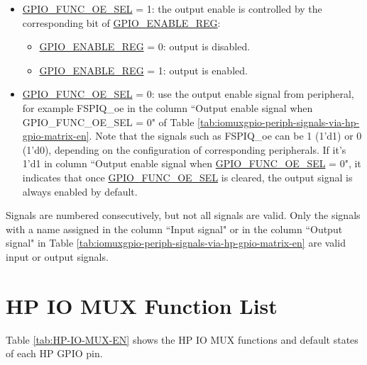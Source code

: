 \documentclass[main\_\_EN.tex]{subfiles}
\begin{document}
\begin{itemize}
    \item \hyperref[fielddesc:GPIOFUNCNOESEL]{GPIO\_FUNC\_OE\_SEL} = 1: the output enable is controlled by the corresponding bit  of \hyperref[regdesc:GPIOENABLEREG]{GPIO\_ENABLE\_REG}:
    \begin{itemize}
        \item \hyperref[regdesc:GPIOENABLEREG]{GPIO\_ENABLE\_REG} = 0: output is disabled.
        \item \hyperref[regdesc:GPIOENABLEREG]{GPIO\_ENABLE\_REG} = 1: output is enabled.
    \end{itemize}
    \item \hyperref[fielddesc:GPIOFUNCNOESEL]{GPIO\_FUNC\_OE\_SEL} = 0: use the output enable signal from peripheral, for example FSPIQ\_oe in the column ``Output enable signal when GPIO\_FUNC\_OE\_SEL = 0" of Table \ref{tab:iomuxgpio-periph-signals-via-hp-gpio-matrix-en}. Note that the signals such as FSPIQ\_oe can be 1 (1'd1) or 0 (1'd0), depending on the configuration of corresponding peripherals. If it's 1'd1 in column ``Output enable signal when \hyperref[fielddesc:GPIOFUNCNOESEL]{GPIO\_FUNC\_OE\_SEL} = 0", it indicates that once  \hyperref[fielddesc:GPIOFUNCNOESEL]{GPIO\_FUNC\_OE\_SEL} is cleared, the output signal is always enabled by default.
\end{itemize}

\begin{tiplisting}
Signals are numbered consecutively, but not all signals are valid. Only the signals with a name assigned in the column ``Input signal" or in the column ``Output signal" in Table \ref{tab:iomuxgpio-periph-signals-via-hp-gpio-matrix-en} are valid input or output signals.
\end{tiplisting}


\tableheaderHPSignalEN
\tablecontentHPSignal


\section{HP IO MUX Function List}

Table \ref{tab:HP-IO-MUX-EN} shows the HP IO MUX functions and default states of each HP GPIO pin.


\tableheaderHPFunctionsEN
\tablecontentHPFunctions
\end{document}
